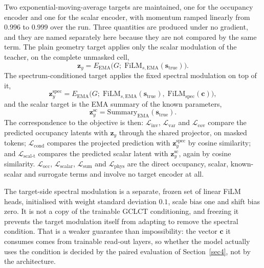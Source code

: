 \documentclass[pdflatex,oneside,sn-mathphys-num]{sn-jnl}
\theoremstyle{thmstyleone}
\theoremstyle{thmstyletwo}
\theoremstyle{thmstylethree}
\begin{document}
Two exponential-moving-average targets are maintained, one for the occupancy encoder
and one for the scalar encoder, with momentum ramped linearly from $0.996$ to $0.999$
over the run. Three quantities are produced under no gradient, and they are named
separately here because they are not compared by the same term. The plain geometry target
applies only the scalar modulation of the teacher, on the complete unmasked cell,
\begin{equation}
\mathbf{z}_y = E_{\mathrm{EMA}}\big(G;\;\mathrm{FiLM}_{s,\mathrm{EMA}}(
\mathbf{s}_{\mathrm{true}})\big).
\end{equation}
The spectrum-conditioned target applies the fixed spectral modulation on top of it,
\begin{equation}
\mathbf{z}_y^{\mathrm{spec}} = E_{\mathrm{EMA}}\big(G;\;
\mathrm{FiLM}_{s,\mathrm{EMA}}(\mathbf{s}_{\mathrm{true}}),\;
\mathrm{FiLM}_{\mathrm{spec}}(\mathbf{c})\big),
\end{equation}
and the scalar target is the EMA summary of the known parameters,
\begin{equation}
\mathbf{z}_y^{\mathrm{sc}} = \mathrm{Summary}_{\mathrm{EMA}}(
\mathbf{s}_{\mathrm{true}}).
\end{equation}
The correspondence to the objective is then: $\mathcal{L}_{\mathrm{inv}}$,
$\mathcal{L}_{\mathrm{var}}$ and $\mathcal{L}_{\mathrm{cov}}$ compare the predicted
occupancy latents with $\mathbf{z}_y$ through the shared projector, on masked tokens;
$\mathcal{L}_{\mathrm{cond}}$ compares the projected prediction with
$\mathbf{z}_y^{\mathrm{spec}}$ by cosine similarity; and
$\mathcal{L}_{\mathrm{scal\text{-}t}}$ compares the predicted scalar latent with
$\mathbf{z}_y^{\mathrm{sc}}$, again by cosine similarity. $\mathcal{L}_{\mathrm{occ}}$,
$\mathcal{L}_{\mathrm{scalar}}$, $\mathcal{L}_{\mathrm{sum}}$ and
$\mathcal{L}_{\mathrm{phys}}$ are the direct occupancy, scalar, known-scalar and
surrogate terms and involve no target encoder at all.

The target-side spectral modulation is a separate, frozen set of linear FiLM heads,
initialised with weight standard deviation $0.1$, scale bias one and shift bias zero. It is
not a copy of the trainable GCLCT conditioning, and freezing it prevents the target
modulation itself from adapting to remove the spectral condition. That is a weaker
guarantee than impossibility: the vector $\mathbf{c}$ it consumes comes from trainable
read-out layers, so whether the model actually uses the condition is decided by the paired
evaluation of Section~\ref{sec4}, not by the architecture.
\end{document}
